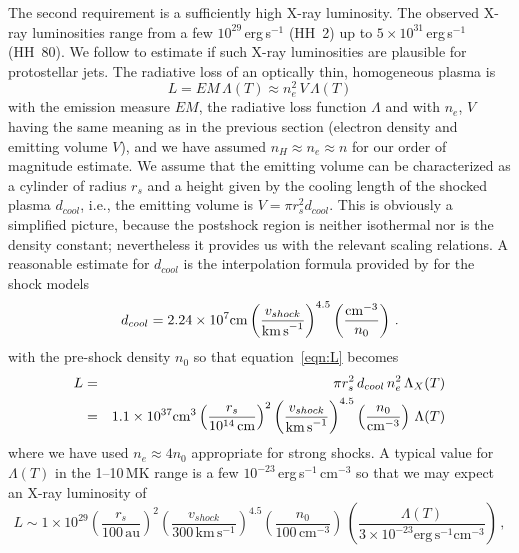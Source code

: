 The second requirement is a sufficiently high X-ray luminosity. The observed X-ray luminosities range from a few $10^{29}$\,erg\,s$^{-1}$ (HH~2) up to $5\times10^{31}$\,erg\,s$^{-1}$ (HH~80). We follow \citet{Raga_2002} to estimate if such X-ray luminosities are plausible for protostellar jets. The radiative loss of an optically thin, homogeneous plasma is 
\begin{equation}
L = EM\, \Lambda(T) \approx n_e^2\, V\,\Lambda(T)  \label{eqn:L}
\end{equation} 
with the emission measure $EM$, the radiative loss function $\Lambda$ and with $n_e$, $V$ having the same meaning as in the previous section (electron density and emitting volume $V$), and we have assumed $n_H\approx n_e \approx n$ for our order of magnitude estimate. We assume that the emitting volume can be characterized as a cylinder of radius $r_s$ and a height given by the cooling length of the shocked plasma $d_{cool}$, i.e., the  emitting volume is $V = \pi r_s^2 d_{cool}$. This is obviously a simplified picture, because the postshock region is neither isothermal nor is the density constant; nevertheless it provides us with the relevant scaling relations.
A reasonable estimate for $d_{cool}$ is the interpolation formula provided by \citet{Heathcote_1998} for the \citet{Hartigan_1987} shock models
\begin{equation}
d_{cool} = 2.24\times10^7 \textrm{cm} \left(\frac{v_{shock} }{\textrm{km\,s}^{-1}} \right)^{4.5} \left(\frac{\textrm{cm}^{-3}}{n_0} \right)\,. \label{eq:dcool}
\end{equation}
with the pre-shock density $n_0$ so that equation~\ref{eqn:L} becomes
\begin{eqnarray}
L & = & \pi r_s^2  \, d_{cool} \, n_e^2\,\Lambda_X(T) \label{eq:L}\\
  & = &  1.1\times10^{37} \textrm{cm}^3 \left(\frac{r_s}{10^{14}\,\textrm{cm}}\right)^2 \left(\frac{v_{shock} }{\textrm{km\,s}^{-1}} \right)^{4.5} \left(\frac{n_0}{\textrm{cm}^{-3}} \right) \, \Lambda(T)
\end{eqnarray}
where we have used $n_e\approx4n_0$ appropriate for strong shocks. A typical value for $\Lambda(T)$ in the 1--10\,MK range is a few $10^{-23}$\,erg\,s$^{-1}\,$cm$^{-3}$ so that we may expect an X-ray luminosity of
\begin{equation}
L \sim 1\times10^{29} \left(\frac{r_s}{100\,\textrm{au}}\right)^2 \left(\frac{v_{shock}}{300\,\textrm{km}\,\textrm{s}^{-1}}\right)^{4.5} \left(\frac{n_0}{100\,\textrm{cm}^{-3}} \right) \, \left( \frac{\Lambda(T)}{3\times10^{-23} \textrm{erg}\, \textrm{s}^{-1} \textrm{cm}^{-3}} \right)\,,
\end{equation}

